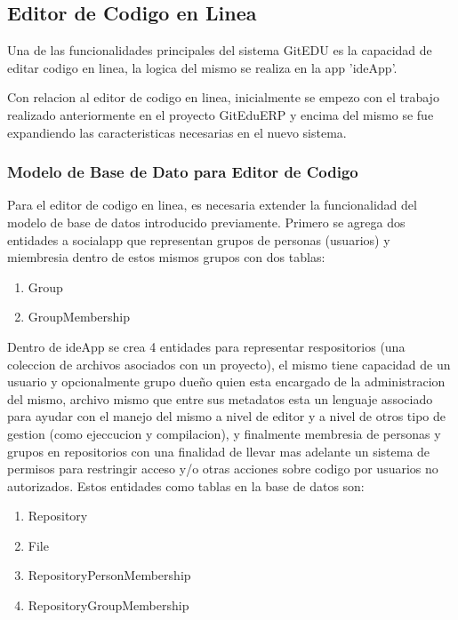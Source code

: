 \subsection{Editor de Codigo en Linea}
Una de las funcionalidades principales del sistema GitEDU es la capacidad de editar codigo en linea, la logica del mismo se realiza en la app 'ideApp'.

Con relacion al editor de codigo en linea, inicialmente se empezo con el trabajo realizado anteriormente en el proyecto GitEduERP y encima del mismo se fue expandiendo las caracteristicas necesarias en el nuevo sistema.

\subsubsection{Modelo de Base de Dato para Editor de Codigo}
Para el editor de codigo en linea, es necesaria extender la funcionalidad del modelo de base de datos introducido previamente. Primero se agrega dos entidades a socialapp que representan grupos de personas (usuarios) y miembresia dentro de estos mismos grupos con dos tablas:
\begin{enumerate}
\item Group
\item GroupMembership
\end{enumerate}

Dentro de ideApp se crea 4 entidades para representar respositorios (una coleccion de archivos asociados con un proyecto), el mismo tiene capacidad de un usuario y opcionalmente grupo dueño quien esta encargado de la administracion del mismo, archivo mismo que entre sus metadatos esta un lenguaje associado para ayudar con el manejo del mismo a nivel de editor y a nivel de otros tipo de gestion (como ejeccucion y compilacion), y finalmente membresia de personas y grupos en repositorios con una finalidad de llevar mas adelante un sistema de permisos para restringir acceso y/o otras acciones sobre codigo por usuarios no autorizados. Estos entidades como tablas en la base de datos son:
\begin{enumerate}
\item Repository
\item File
\item RepositoryPersonMembership
\item RepositoryGroupMembership
\end{enumerate}


